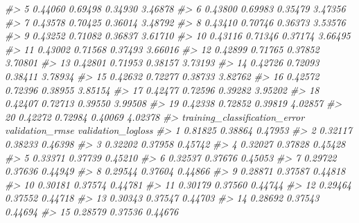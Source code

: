 \documentclass[]{book}
\newenvironment{Shaded}{\begin{snugshade}}{\end{snugshade}}
\newcommand{\CommentTok}[1]{\textcolor[rgb]{0.56,0.35,0.01}{\textit{#1}}}
\begin{document}
\begin{Shaded}
\begin{Highlighting}[]
\CommentTok{#> 5           0.44060      0.69498         0.34930       3.46878}
\CommentTok{#> 6           0.43800      0.69983         0.35479       3.47356}
\CommentTok{#> 7           0.43578      0.70425         0.36014       3.48792}
\CommentTok{#> 8           0.43410      0.70746         0.36373       3.53576}
\CommentTok{#> 9           0.43252      0.71082         0.36837       3.61710}
\CommentTok{#> 10          0.43116      0.71346         0.37174       3.66495}
\CommentTok{#> 11          0.43002      0.71568         0.37493       3.66016}
\CommentTok{#> 12          0.42899      0.71765         0.37852       3.70801}
\CommentTok{#> 13          0.42801      0.71953         0.38157       3.73193}
\CommentTok{#> 14          0.42726      0.72093         0.38411       3.78934}
\CommentTok{#> 15          0.42632      0.72277         0.38733       3.82762}
\CommentTok{#> 16          0.42572      0.72396         0.38955       3.85154}
\CommentTok{#> 17          0.42477      0.72596         0.39282       3.95202}
\CommentTok{#> 18          0.42407      0.72713         0.39550       3.99508}
\CommentTok{#> 19          0.42338      0.72852         0.39819       4.02857}
\CommentTok{#> 20          0.42272      0.72984         0.40069       4.02378}
\CommentTok{#>    training_classification_error validation_rmse validation_logloss}
\CommentTok{#> 1                        0.81825         0.38864            0.47953}
\CommentTok{#> 2                        0.32117         0.38233            0.46398}
\CommentTok{#> 3                        0.32202         0.37958            0.45742}
\CommentTok{#> 4                        0.32027         0.37828            0.45428}
\CommentTok{#> 5                        0.33371         0.37739            0.45210}
\CommentTok{#> 6                        0.32537         0.37676            0.45053}
\CommentTok{#> 7                        0.29722         0.37636            0.44949}
\CommentTok{#> 8                        0.29544         0.37604            0.44866}
\CommentTok{#> 9                        0.28871         0.37587            0.44818}
\CommentTok{#> 10                       0.30181         0.37574            0.44781}
\CommentTok{#> 11                       0.30179         0.37560            0.44744}
\CommentTok{#> 12                       0.29464         0.37552            0.44718}
\CommentTok{#> 13                       0.30343         0.37547            0.44703}
\CommentTok{#> 14                       0.28692         0.37543            0.44694}
\CommentTok{#> 15                       0.28579         0.37536            0.44676}

\end{Highlighting}
\end{Shaded}
\end{document}
